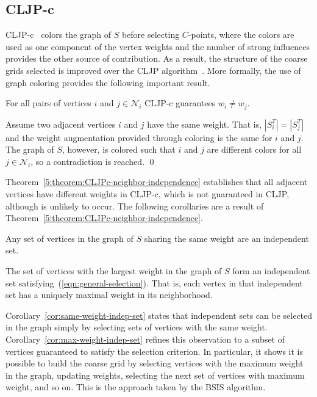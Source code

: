 \documentclass{elsart}
\newenvironment{proof}{\begin{pf}}{\qed\end{pf}}
\begin{document}
\subsection{CLJP-c}
CLJP-c~\cite{alber-cljpc} colors the graph of $S$ before selecting
$C$-points, where the colors are used as one component of the vertex
weights and the number of strong influences provides the other source
of contribution. As a result, the structure of the coarse grids
selected is improved over the CLJP algorithm~\cite{Cleary1998}. More
formally, the use of graph coloring provides the following important
result.
\begin{thm}
\label{5:theorem:CLJPc-neighbor-independence}
For all pairs of vertices $i$ and $j \in \mathcal{N}_i$ CLJP-c
guarantees $w_i \ne w_j$.
\end{thm}
\begin{proof}
Assume two adjacent vertices $i$ and $j$ have the same weight. That is,
$|S_i^T| = |S_j^T|$ and the weight augmentation provided through
coloring is the same for $i$ and $j$. The graph of $S$, however, is
colored such that $i$ and $j$ are different colors for all $j \in
\mathcal{N}_i$, so a contradiction is reached.
\end{proof}
Theorem~\ref{5:theorem:CLJPc-neighbor-independence} establishes that
all adjacent vertices have different weights in CLJP-c, which is not
guaranteed in CLJP, although is unlikely to occur. The following
corollaries are a result of
Theorem~\ref{5:theorem:CLJPc-neighbor-independence}.
\begin{cor}
\label{cor:same-weight-indep-set}
Any set of vertices in the graph of $S$ sharing the same weight are an
independent set.
\end{cor}
\begin{cor}
\label{cor:max-weight-indep-set}
The set of vertices with the largest weight in the graph of $S$ form
an independent set satisfying~(\ref{eqn:general-selection}). That is,
each vertex in that independent set has a uniquely maximal weight in
its neighborhood.
\end{cor}
Corollary~\ref{cor:same-weight-indep-set} states that independent sets
can be selected in the graph simply by selecting sets of vertices with
the same weight. Corollary~\ref{cor:max-weight-indep-set} refines this
observation to a subset of vertices guaranteed to satisfy the
selection criterion. In particular, it shows it is possible to build
the coarse grid by selecting vertices with the maximum weight in the
graph, updating weights, selecting the next set of vertices with
maximum weight, and so on. This is the approach taken by the BSIS
algorithm.
\end{document}
